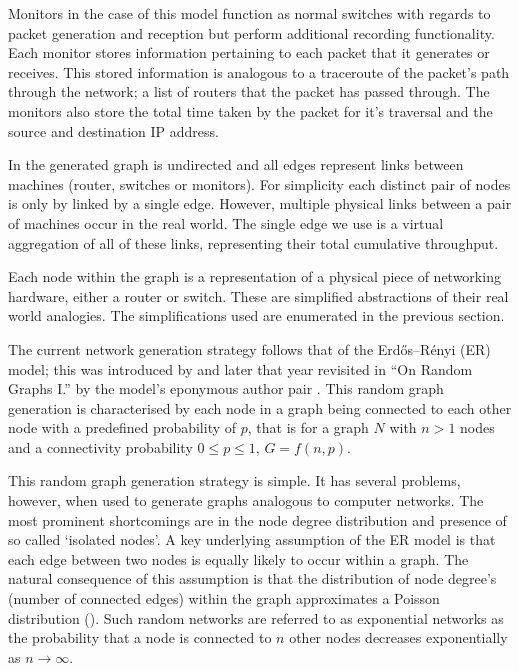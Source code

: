 Monitors in the case of this model function as normal switches with regards to packet generation and reception but perform additional recording functionality. Each monitor stores information pertaining to each packet that it generates or receives. This stored information is analogous to a traceroute of the packet's path through the network; a list of routers that the packet has passed through. The monitors also store the total time taken by the packet for it’s traversal and the source and destination IP address.\par
In the generated graph is undirected and all edges represent links between machines (router, switches or monitors). For simplicity each distinct pair of nodes is only by linked by a single edge. However, multiple physical links between a pair of machines occur in the real world. The single edge we use is a virtual aggregation of all of these links, representing their total cumulative throughput. \par
Each node within the graph is a representation of a physical piece of networking hardware, either a router or switch. These are simplified abstractions of their real world analogies. The simplifications used are enumerated in the previous section.\par
The current network generation strategy follows that of the Erdős–Rényi (ER) model; this was introduced by \cite{gilbert_random_1961} and later that year revisited in “On Random Graphs I.” by the model’s eponymous author pair \cite{erdos_random_1959}. This random graph generation is characterised by each node in a graph being connected to each other node with a predefined probability of $p$, that is for a graph $N$ with $n>1$ nodes and a connectivity probability $0\leq p\leq 1$, $G=f(n,p)$.\par
This random graph generation strategy is simple. It has several problems, however, when used to generate graphs analogous to computer networks. The most prominent shortcomings are in the node degree distribution and presence of so called ‘isolated nodes’. A key underlying assumption of the ER model is that each edge between two nodes is equally likely to occur within a graph. The natural consequence of this assumption is that the distribution of node degree’s (number of connected edges) within the graph approximates a Poisson distribution (\cite{albert-laszlo_scale-free_2003}). Such random networks are referred to as exponential networks as the probability that a node is connected to $n$ other nodes decreases exponentially as $n\to\infty$.\par
